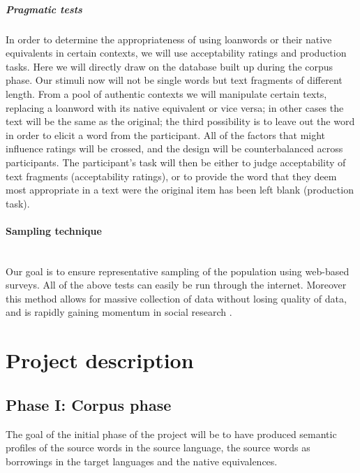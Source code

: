 \documentclass[a4paper]{article}
\begin{document}
\subparagraph{Pragmatic tests}
In order to determine the appropriateness of using loanwords or their native equivalents in certain contexts, we will use acceptability ratings and production tasks.
Here we will directly draw on the database built up during the corpus phase.
Our stimuli now will not be single words but text fragments of different length.
From a pool of authentic contexts we will manipulate certain texts, replacing a loanword with its native equivalent or vice versa; in other cases the text will be the same as the original; the third possibility is to leave out the word in order to elicit a word from the participant.
All of the factors that might influence ratings will be crossed, and the design will be counterbalanced across participants.
The participant's task will then be either to judge acceptability of text fragments (acceptability ratings), or to provide the word that they deem most appropriate in a text were the original item has been left blank (production task).


\paragraph{Sampling technique}
\hspace{0pt} \\
Our goal is to ensure representative sampling of the population using web-based surveys.
All of the above tests can easily be run through the internet.
Moreover this method allows for massive collection of data without losing quality of data, and is rapidly gaining momentum in social research \citep{Denscombe2010}.










\section{Project description}



\subsection{Phase I: Corpus phase}
\label{sect_corpus}

The goal of the initial phase of the project will be to have produced semantic profiles of the source words in the source language, the source words as borrowings in the target languages and the native equivalences. 
\end{document}
